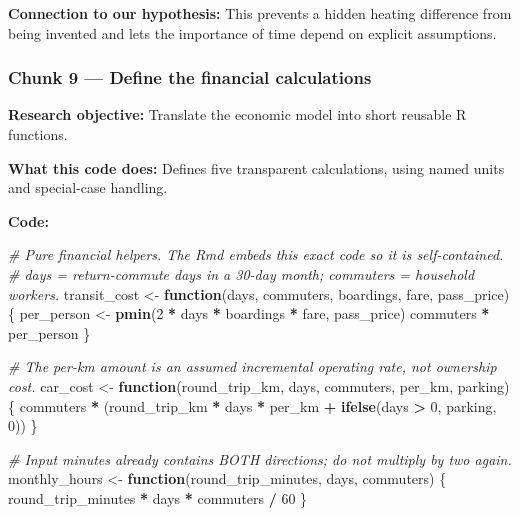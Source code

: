 \documentclass[
]{article}
\newenvironment{Shaded}{\begin{snugshade}}{\end{snugshade}}
\newcommand{\CommentTok}[1]{\textcolor[rgb]{0.56,0.35,0.01}{\textit{#1}}}
\newcommand{\ControlFlowTok}[1]{\textcolor[rgb]{0.13,0.29,0.53}{\textbf{#1}}}
\newcommand{\DecValTok}[1]{\textcolor[rgb]{0.00,0.00,0.81}{#1}}
\newcommand{\FunctionTok}[1]{\textcolor[rgb]{0.13,0.29,0.53}{\textbf{#1}}}
\newcommand{\NormalTok}[1]{#1}
\newcommand{\OtherTok}[1]{\textcolor[rgb]{0.56,0.35,0.01}{#1}}
\newcommand{\SpecialCharTok}[1]{\textcolor[rgb]{0.81,0.36,0.00}{\textbf{#1}}}
\begin{document}
\textbf{Connection to our hypothesis:} This prevents a hidden heating
difference from being invented and lets the importance of time depend on
explicit assumptions.

\subsubsection{Chunk 9 --- Define the financial
calculations}\label{chunk-9-define-the-financial-calculations}

\textbf{Research objective:} Translate the economic model into short
reusable R functions.

\textbf{What this code does:} Defines five transparent calculations,
using named units and special-case handling.

\textbf{Code:}

\begin{Shaded}
\begin{Highlighting}[]
\CommentTok{\# Pure financial helpers. The Rmd embeds this exact code so it is self{-}contained.}
\CommentTok{\# days = return{-}commute days in a 30{-}day month; commuters = household workers.}
\NormalTok{transit\_cost }\OtherTok{\textless{}{-}} \ControlFlowTok{function}\NormalTok{(days, commuters, boardings, fare, pass\_price) \{}
\NormalTok{  per\_person }\OtherTok{\textless{}{-}} \FunctionTok{pmin}\NormalTok{(}\DecValTok{2} \SpecialCharTok{*}\NormalTok{ days }\SpecialCharTok{*}\NormalTok{ boardings }\SpecialCharTok{*}\NormalTok{ fare, pass\_price)}
\NormalTok{  commuters }\SpecialCharTok{*}\NormalTok{ per\_person}
\NormalTok{\}}

\CommentTok{\# The per{-}km amount is an assumed incremental operating rate, not ownership cost.}
\NormalTok{car\_cost }\OtherTok{\textless{}{-}} \ControlFlowTok{function}\NormalTok{(round\_trip\_km, days, commuters, per\_km, parking) \{}
\NormalTok{  commuters }\SpecialCharTok{*}\NormalTok{ (round\_trip\_km }\SpecialCharTok{*}\NormalTok{ days }\SpecialCharTok{*}\NormalTok{ per\_km }\SpecialCharTok{+} \FunctionTok{ifelse}\NormalTok{(days }\SpecialCharTok{\textgreater{}} \DecValTok{0}\NormalTok{, parking, }\DecValTok{0}\NormalTok{))}
\NormalTok{\}}

\CommentTok{\# Input minutes already contains BOTH directions; do not multiply by two again.}
\NormalTok{monthly\_hours }\OtherTok{\textless{}{-}} \ControlFlowTok{function}\NormalTok{(round\_trip\_minutes, days, commuters) \{}
\NormalTok{  round\_trip\_minutes }\SpecialCharTok{*}\NormalTok{ days }\SpecialCharTok{*}\NormalTok{ commuters }\SpecialCharTok{/} \DecValTok{60}
\NormalTok{\}}


\end{Highlighting}
\end{Shaded}
\end{document}
